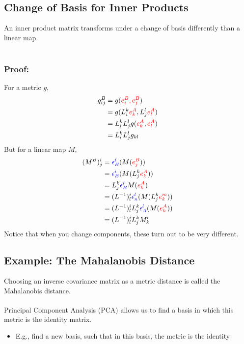 \documentclass[10pt]{article}
\begin{document}
\subsection*{Change of Basis for Inner Products}
An inner product matrix transforms under a change of basis differently than a linear map.\\\\
\subsubsection*{Proof:}
For a metric $g$,
\begin{align*}
    g_{ij}^B &= g(\textcolor{red}{e_i^B, e_j^B})\\
    &= g(L_i^k \textcolor{red}{e_k^A}, L_j^l \textcolor{red}{e_l^A})\\
    &= L_i^k L_j^l g(\textcolor{red}{e_k^A}, \textcolor{red}{e_l^A})\\
    &= L_i^k L_j^l g_{kl}
\end{align*}
But for a linear map $M$, 
\begin{align*}
    (M^B)_j^i &= \textcolor{blue}{\epsilon_B^i}(M(\textcolor{red}{e_j^B}))\\
    &= \textcolor{blue}{\epsilon_B^i}(M(L_j^k \textcolor{red}{e_k^A}))\\
    &= L_j^k \textcolor{blue}{\epsilon_B^i} M(\textcolor{red}{e_k^A})\\
    &= (L^{-1})_l^i \textcolor{blue}{\epsilon_n^l}(M(L_j^k \textcolor{red}{e_k^m}))\\
    &= (L^{-1})_l^i L_j^k \textcolor{blue}{\epsilon_A^l}(M(\textcolor{red}{e_k^A}))\\
    &= (L^{-1})_l^i L_j^k M_k^l
\end{align*}
Notice that when you change components, these turn out to be very different.

\subsection*{Example: The Mahalanobis Distance}
Choosing an inverse covariance matrix as a metric distance is called the Mahalanobis distance.\\\\
Principal Component Analysis (PCA) allows us to find a basis in which this metric is the identity matrix.
\begin{itemize}
    \item E.g., find a new basis, such that in this basis, the metric is the identity
\end{itemize}
\end{document}
